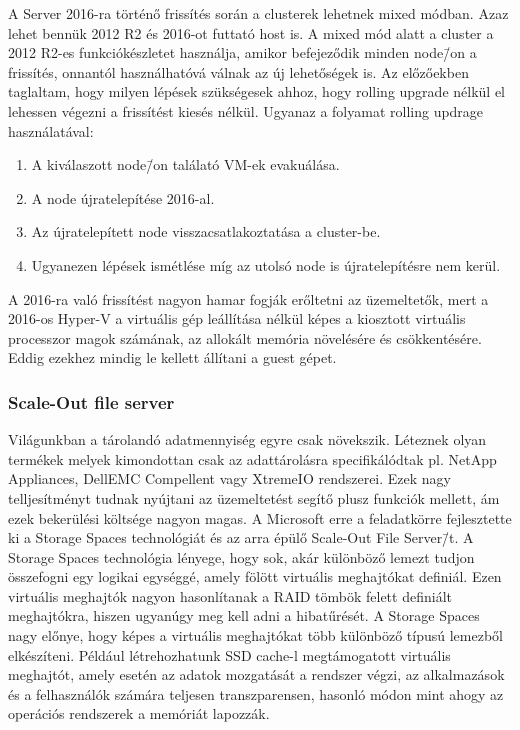 \documentclass[12pt,oneside,justify]{book}
\begin{document}
A Server 2016-ra történő frissítés során a clusterek lehetnek mixed módban. Azaz lehet bennük 2012 R2 és 2016-ot futtató host is. A mixed mód alatt a cluster a 2012 R2-es funkciókészletet használja, amikor befejeződik minden node\=/on a frissítés, onnantól használhatóvá válnak az új lehetőségek is. Az előzőekben taglaltam, hogy milyen lépések szükségesek ahhoz, hogy rolling upgrade nélkül el lehessen végezni a frissítést kiesés nélkül. 
Ugyanaz a folyamat rolling updrage használatával:
\begin{enumerate}
	\item A kiválaszott node\=/on találató VM-ek evakuálása.
	\item A node újratelepítése 2016-al.
	\item Az újratelepített node visszacsatlakoztatása a cluster-be. 
	\item Ugyanezen lépések ismétlése míg az utolsó node is újratelepítésre nem kerül.
\end{enumerate}

A 2016-ra való frissítést nagyon hamar fogják erőltetni az üzemeltetők, mert a 2016-os Hyper-V a virtuális gép leállítása nélkül képes a kiosztott virtuális processzor magok számának, az allokált memória növelésére és csökkentésére. Eddig ezekhez mindig le kellett állítani a guest gépet. 

\subsubsection{Scale-Out file server}

Világunkban a tárolandó adatmennyiség egyre csak növekszik. Léteznek olyan termékek melyek kimondottan csak az adattárolásra specifikálódtak pl. NetApp Appliances, DellEMC Compellent vagy XtremeIO rendszerei. Ezek nagy telljesítményt tudnak nyújtani az üzemeltetést segítő plusz funkciók mellett, ám ezek bekerülési költsége nagyon magas.
A Microsoft erre a feladatkörre fejlesztette ki a Storage Spaces technológiát és az arra épülő Scale-Out File Server\=/t.
\newline
A Storage Spaces technológia lényege, hogy sok, akár különböző lemezt tudjon összefogni egy logikai egységgé, amely fölött virtuális meghajtókat definiál. Ezen virtuális meghajtók nagyon hasonlítanak a RAID tömbök felett definiált meghajtókra, hiszen ugyanúgy meg kell adni a hibatűrését.  A Storage Spaces nagy előnye, hogy képes a virtuális meghajtókat több különböző típusú lemezből elkészíteni. Például létrehozhatunk SSD cache-l megtámogatott virtuális meghajtót, amely esetén az adatok mozgatását a rendszer végzi, az alkalmazások és a felhasználók számára teljesen transzparensen, hasonló módon mint ahogy az operációs rendszerek a memóriát lapozzák.
\end{document}
